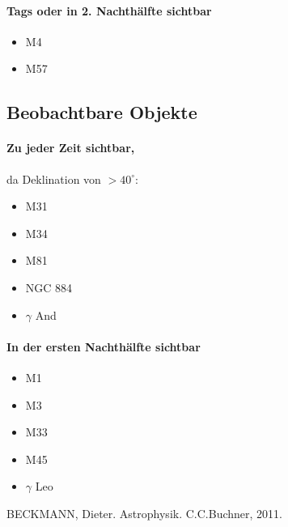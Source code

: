 \documentclass[titlepage]{scrartcl}
\begin{document}
\paragraph{Tags oder in 2. Nachthälfte sichtbar}
\begin{itemize}
\item M4
\item M57
\end{itemize}
\subsection{Beobachtbare Objekte}
\paragraph{Zu jeder Zeit sichtbar,} da Deklination von $>40^\circ$:
\begin{itemize}
\item M31
\item M34
\item M81
\item NGC 884
\item $\gamma$ And
\end{itemize}
\paragraph{In der ersten Nachthälfte sichtbar}
\begin{itemize}
\item M1
\item M3
\item M33
\item M45
\item $\gamma$ Leo
\end{itemize}
\begin{thebibliography}{9}
 BECKMANN, Dieter. Astrophysik. C.C.Buchner, 2011.
\end{thebibliography}
\end{document}
